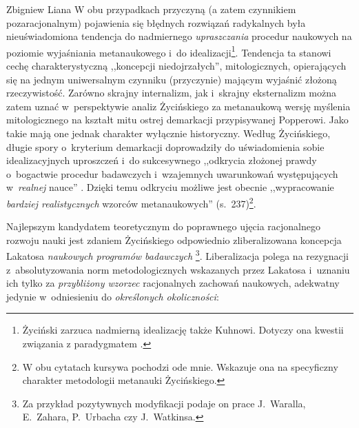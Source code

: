 \begin{artplenv}{Zbigniew Liana}
W obu przypadkach przyczyną (a zatem czynnikiem pozaracjonalnym) pojawienia się błędnych rozwiązań radykalnych była
nieuświadomiona tendencja do nadmiernego \textit{upraszczania} procedur naukowych na poziomie wyjaśniania
metanaukowego i~do idealizacji\footnote{Życiński zarzuca nadmierną idealizację także Kuhnowi.
Dotyczy ona kwestii związania z paradygmatem
\parencite*[zob.][s.~152]{zycinski_jezyk_1983}.
}. Tendencja ta stanowi cechę charakterystyczną ,,koncepcji niedojrzałych'',
mitologicznych, opierających się na jednym uniwersalnym czynniku (przyczynie) mającym wyjaśnić złożoną rzeczywistość.
Zarówno skrajny internalizm, jak i~skrajny eksternalizm można zatem uznać w~perspektywie analiz Życińskiego za
metanaukową wersję myślenia mitologicznego na kształt mitu ostrej demarkacji przypisywanej Popperowi. Jako takie mają
one jednak charakter wyłącznie historyczny. Według Życińskiego, długie spory o~kryterium demarkacji doprowadziły do
uświadomienia sobie idealizacyjnych uproszczeń i~do sukcesywnego ,,odkrycia złożonej prawdy o~bogactwie procedur
badawczych i~wzajemnych uwarunkowań występujących w~\textit{realnej} nauce''
\parencite[s.~230]{zycinski_elementy_1996}.
Dzięki temu odkryciu możliwe jest obecnie ,,wypracowanie \textit{bardziej realistycznych} wzorców
metanaukowych'' (s.~237)\footnote{W obu cytatach kursywa
pochodzi ode mnie. Wskazuje ona na specyficzny charakter metodologii metanauki Życińskiego.}.

Najlepszym kandydatem teoretycznym do poprawnego ujęcia racjonalnego rozwoju nauki jest zdaniem Życińskiego odpowiednio
zliberalizowana koncepcja Lakatosa \textit{naukowych programów badawczych}
\parencite[s.~244n]{zycinski_elementy_1996}\footnote{Za przykład pozytywnych modyfikacji podaje on prace J.~Waralla, E.~Zahara,
P.~Urbacha czy J.~Watkinsa.}. Liberalizacja polega na rezygnacji z~absolutyzowania norm metodologicznych wskazanych przez
Lakatosa i~uznaniu ich tylko za \textit{przybliżony wzorzec} racjonalnych zachowań naukowych, adekwatny
jedynie w~odniesieniu do
\textit{określonych okoliczności}:


\end{artplenv}
